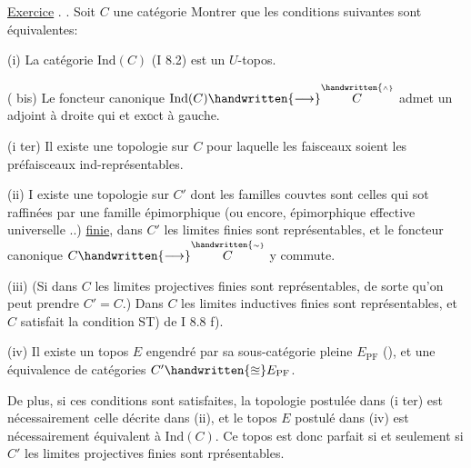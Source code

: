 \reversemarginpar
{}
\normalmarginpar

\uline{Exercice} . . Soit $C$ une  catégorie\handwritten{,} Montrer que les conditions suivantes sont équivalentes:

(i) La catégorie $\mathrm{Ind}(C)$ (I 8.2) est un \uline{$U$}-topos.

( bis) Le foncteur canonique $\mathrm{Ind}(C)\handwritten{\longrightarrow}\overset{\handwritten{\scriptscriptstyle\wedge}}{C}$ admet un adjoint à droite qui  et ex\(\mathbb{a}\)ct à gauche.

(i ter) Il existe une topologie sur $C$ pour laquelle les faisceaux soient les préfaisceaux ind-représentables.


(ii)  I existe une topologie sur $C'$ dont les familles couvtes sont celles qui sot raffinées par une famille épimorphique (ou encore, épimorphique effective universelle ..) \uline{finie}, dans $C'$ les limites  finies sont représentables, et le foncteur canonique $C\handwritten{\longrightarrow}\overset{\handwritten{\scriptscriptstyle\sim}}{C}$  y commute.

(iii) (Si dans $C$ les limites projectives finies sont représentables, de sorte qu'on peut prendre $C'=C$.) Dans $C$ les limites inductives finies sont représentables, et $C$ satisfait la condition ST) de I 8.8 f).
\reversemarginpar
\margin{\handwritten{$\times$}}
\normalmarginpar

(iv) Il existe un topos $E$ engendré par sa sous-catégorie pleine $E_{\mathrm{PF}}$ (\quad\quad), et une équivalence de catégories $C'\handwritten{\approxeq}E_{\mathrm{PF}}$.
\reversemarginpar
\margin{\handwritten{$\times$}}
\normalmarginpar

De plus,  si ces conditions sont satisfaites, la topologie postulée dans (i ter) est nécessairement celle décrite dans (ii), et le topos $E$ postulé dans (iv) est nécessairement équivalent à $\mathrm{Ind}(C)$. Ce topos est donc parfait si et seulement si  $C'$  les limites projectives finies sont rprésentables.

